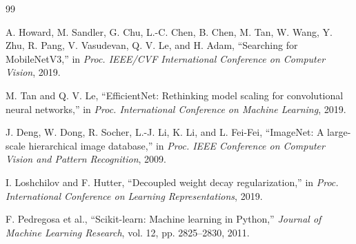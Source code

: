 \documentclass[letterpaper, 10 pt]{IEEEconf}
\begin{document}
\begin{thebibliography}{99}

A. Howard, M. Sandler, G. Chu, L.-C. Chen, B. Chen, M. Tan, W. Wang,
Y. Zhu, R. Pang, V. Vasudevan, Q. V. Le, and H. Adam,
``Searching for MobileNetV3,'' in \emph{Proc. IEEE/CVF International
Conference on Computer Vision}, 2019.

M. Tan and Q. V. Le, ``EfficientNet: Rethinking model scaling for
convolutional neural networks,'' in \emph{Proc. International Conference on
Machine Learning}, 2019.

J. Deng, W. Dong, R. Socher, L.-J. Li, K. Li, and L. Fei-Fei,
``ImageNet: A large-scale hierarchical image database,'' in \emph{Proc. IEEE
Conference on Computer Vision and Pattern Recognition}, 2009.

I. Loshchilov and F. Hutter, ``Decoupled weight decay regularization,'' in
\emph{Proc. International Conference on Learning Representations}, 2019.

F. Pedregosa et al., ``Scikit-learn: Machine learning in Python,''
\emph{Journal of Machine Learning Research}, vol. 12, pp. 2825--2830, 2011.

\end{thebibliography}
\end{document}
